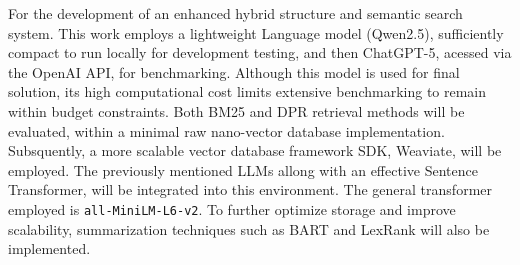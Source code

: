 For the development of an enhanced hybrid structure and semantic search system. This work employs a lightweight Language model (Qwen2.5), sufficiently compact to run locally for development testing, and then ChatGPT-5, acessed via the OpenAI API, for benchmarking. Although this model is used for final solution, its high computational cost limits extensive benchmarking to remain within budget constraints. Both BM25 and DPR retrieval methods will be evaluated, within a minimal raw nano-vector database implementation. Subsquently, a more scalable vector database framework SDK, Weaviate, will be employed. The previously mentioned \glspl{LLM} allong with an effective Sentence Transformer, will be integrated into this environment. The general transformer employed is \texttt{all-MiniLM-L6-v2}. To further optimize storage and improve scalability, summarization techniques such as BART and LexRank will also be implemented.





